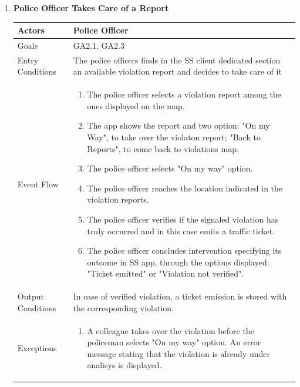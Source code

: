 \begin{enumerate}
	\item \textbf{Police Officer Takes Care of a Report}
		\begin{table}[h!]
		\centering
		\begin{tabular}{|l|p{}|}
		\hline
		Actors            			&       	Police Officer\\ \hline
		Goals             			&         	GA2.1, GA2.3\\ \hline
		Entry Conditions  	&  		%
													The police officers finds in the SS client dedicated section an available violation report and decides to take care of it \\ \hline
		Event Flow        		&          
				\begin{enumerate}[label=\alph*)]
					\item The police officer selects a violation report among the ones displayed on the map.
					\item The app shows the report and two option: "On my Way", to take over the violaton report; "Back to Reports", to come back to violations map.
					\item The police officer selects "On my way" option.
					\item The police officer reaches the location indicated in the violation reports.
					\item The police officer verifies if the signaled violation has truly occurred and in this case emits a traffic ticket.
					\item The police officer concludes intervention specifying its outcome in SS app, through the options displayed: "Ticket emitted" or "Violation not verified". 
					\end{enumerate}\\ \hline
		Output Conditions &    		In case of verified violation, a ticket emission is stored with the corresponding violation. \\ \hline
		Exceptions        		&       	
				\begin{enumerate}[label=\alph*)]
					\item A colleague takes over the violation before the policeman selects "On my way" option. An error message stating that the violation is already under analisys is displayed.
				\end{enumerate}\\ \hline
	\end{tabular}
	\end{table}
	
	\end{enumerate}
	
